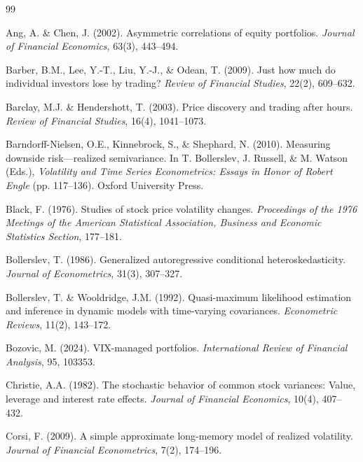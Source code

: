 \documentclass[12pt,a4paper]{article}
\begin{document}

\begin{thebibliography}{99}

Ang, A. \& Chen, J. (2002). Asymmetric correlations of equity portfolios. \textit{Journal of Financial Economics}, 63(3), 443--494.

Barber, B.M., Lee, Y.-T., Liu, Y.-J., \& Odean, T. (2009). Just how much do individual investors lose by trading? \textit{Review of Financial Studies}, 22(2), 609--632.

Barclay, M.J. \& Hendershott, T. (2003). Price discovery and trading after hours. \textit{Review of Financial Studies}, 16(4), 1041--1073.

Barndorff-Nielsen, O.E., Kinnebrock, S., \& Shephard, N. (2010). Measuring downside risk---realized semivariance. In T. Bollerslev, J. Russell, \& M. Watson (Eds.), \textit{Volatility and Time Series Econometrics: Essays in Honor of Robert Engle} (pp. 117--136). Oxford University Press.

Black, F. (1976). Studies of stock price volatility changes. \textit{Proceedings of the 1976 Meetings of the American Statistical Association, Business and Economic Statistics Section}, 177--181.

Bollerslev, T. (1986). Generalized autoregressive conditional heteroskedasticity. \textit{Journal of Econometrics}, 31(3), 307--327.

Bollerslev, T. \& Wooldridge, J.M. (1992). Quasi-maximum likelihood estimation and inference in dynamic models with time-varying covariances. \textit{Econometric Reviews}, 11(2), 143--172.

Bozovic, M. (2024). VIX-managed portfolios. \textit{International Review of Financial Analysis}, 95, 103353.

Christie, A.A. (1982). The stochastic behavior of common stock variances: Value, leverage and interest rate effects. \textit{Journal of Financial Economics}, 10(4), 407--432.

Corsi, F. (2009). A simple approximate long-memory model of realized volatility. \textit{Journal of Financial Econometrics}, 7(2), 174--196.


\end{thebibliography}
\end{document}
